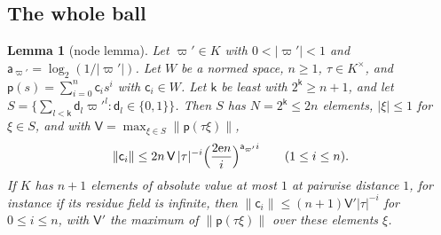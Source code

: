 \documentclass[11pt]{amsart}
\newtheorem{lemma}[theorem]{Lemma}
\theoremstyle{definition}
\theoremstyle{remark}
\numberwithin{equation}{section}
\newcommand{\abs}[1]{\lvert #1\rvert}
\newcommand{\norm}[1]{\lVert #1\rVert}
\theoremstyle{plain}
\theoremstyle{definition}
\theoremstyle{plain}
\begin{document}
\subsection{The whole ball}\label{dp:ssec:ball}

\begin{lemma}[node lemma]\label{dp:lem:node}
Let $\varpi'\in K$ with $0<\abs{\varpi'}<1$ and $\mathsf a_{\varpi'}=\log_2(1/\abs{\varpi'})$. Let $W$ be a normed space, $n\ge1$, $\tau\in K^\times$, and $\mathsf p(s)=\sum_{i=0}^n\mathsf c_is^i$ with $\mathsf c_i\in W$. Let $\mathsf k$ be least with $2^{\mathsf k}\ge n+1$, and let $S=\{\sum_{l<\mathsf k}\mathsf d_l\varpi'^l:\mathsf d_l\in\{0,1\}\}$. Then $S$ has $N=2^{\mathsf k}\le2n$ elements, $\abs\xi\le1$ for $\xi\in S$, and with $\mathsf V=\max_{\xi\in S}\norm{\mathsf p(\tau\xi)}$,
\begin{equation}\label{dp:4a:eq:node}
 \norm{\mathsf c_i}\le2n\,\mathsf V\,\abs\tau^{-i}\Bigl(\frac{2\mathrm en}i\Bigr)^{\mathsf a_{\varpi'} i}\qquad(1\le i\le n).
\end{equation}
If $K$ has $n+1$ elements of absolute value at most $1$ at pairwise distance $1$, for instance if its residue field is infinite, then $\norm{\mathsf c_i}\le(n+1)\mathsf V'\abs\tau^{-i}$ for $0\le i\le n$, with $\mathsf V'$ the maximum of $\norm{\mathsf p(\tau\xi)}$ over these elements $\xi$.
\end{lemma}
\end{document}
